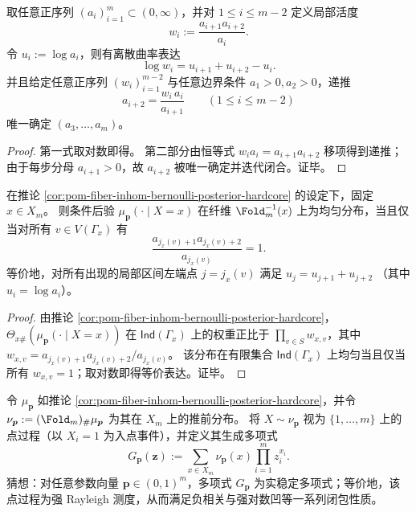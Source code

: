 \begin{proposition}[局部活度场的离散可积性与两点可识别]\label{prop:pom-inhom-logit-activity-identifiability}
取任意正序列 \((a_i)_{i=1}^{m}\subset(0,\infty)\)，并对 \(1\le i\le m-2\) 定义局部活度
\[
w_i:=\frac{a_{i+1}a_{i+2}}{a_i}.
\]
令 \(u_i:=\log a_i\)，则有离散曲率表达
\[
\log w_i=u_{i+1}+u_{i+2}-u_i.
\]
并且给定任意正序列 \((w_i)_{i=1}^{m-2}\) 与任意边界条件 \(a_1>0,a_2>0\)，递推
\[
a_{i+2}=\frac{w_i\,a_i}{a_{i+1}}\qquad(1\le i\le m-2)
\]
唯一确定 \((a_3,\dots,a_m)\)。
\end{proposition}

\begin{proof}
第一式取对数即得。
第二部分由恒等式 \(w_i a_i=a_{i+1}a_{i+2}\) 移项得到递推；由于每步分母 \(a_{i+1}>0\)，故 \(a_{i+2}\) 被唯一确定并迭代闭合。证毕。
\end{proof}

\begin{proposition}[条件均匀性与活度场平坦性]\label{prop:pom-fiber-inhom-conditional-uniformity}
在推论 \ref{cor:pom-fiber-inhom-bernoulli-posterior-hardcore} 的设定下，固定 \(x\in X_m\)。
则条件后验 \(\mu_{\boldsymbol p}(\cdot\mid X=x)\) 在纤维 \(\Fold_m^{-1}(x)\) 上为均匀分布，当且仅当对所有 \(v\in V(\Gamma_x)\) 有
\[
\frac{a_{j_x(v)+1}a_{j_x(v)+2}}{a_{j_x(v)}}=1.
\]
等价地，对所有出现的局部区间左端点 \(j=j_x(v)\) 满足
\(
u_{j}=u_{j+1}+u_{j+2}
\)
（其中 \(u_i=\log a_i\)）。
\end{proposition}

\begin{proof}
由推论 \ref{cor:pom-fiber-inhom-bernoulli-posterior-hardcore}，
\(\Theta_{x\#}(\mu_{\boldsymbol p}(\cdot\mid X=x))\) 在 \(\mathsf{Ind}(\Gamma_x)\) 上的权重正比于 \(\prod_{v\in S}w_{x,v}\)，其中
\(
w_{x,v}=a_{j_x(v)+1}a_{j_x(v)+2}/a_{j_x(v)}
\)。
该分布在有限集合 \(\mathsf{Ind}(\Gamma_x)\) 上均匀当且仅当所有 \(w_{x,v}=1\)；取对数即得等价表达。证毕。
\end{proof}





\begin{conjecture}\label{conj:pom-fold-pushforward-strong-rayleigh}
令 \(\mu_{\boldsymbol p}\) 如推论 \ref{cor:pom-fiber-inhom-bernoulli-posterior-hardcore}，并令 \(\nu_{\boldsymbol p}:=(\Fold_m)_{\#}\mu_{\boldsymbol p}\) 为其在 \(X_m\) 上的推前分布。
将 \(X\sim \nu_{\boldsymbol p}\) 视为 \(\{1,\dots,m\}\) 上的点过程（以 \(X_i=1\) 为入点事件），并定义其生成多项式
\[
G_{\boldsymbol p}(\boldsymbol{z})
:=\sum_{x\in X_m}\nu_{\boldsymbol p}(x)\prod_{i=1}^{m} z_i^{x_i}.
\]
猜想：对任意参数向量 \(\boldsymbol p\in(0,1)^m\)，多项式 \(G_{\boldsymbol p}\) 为实稳定多项式；等价地，该点过程为强 Rayleigh 测度，从而满足负相关与强对数凹等一系列闭包性质。
\end{conjecture}

